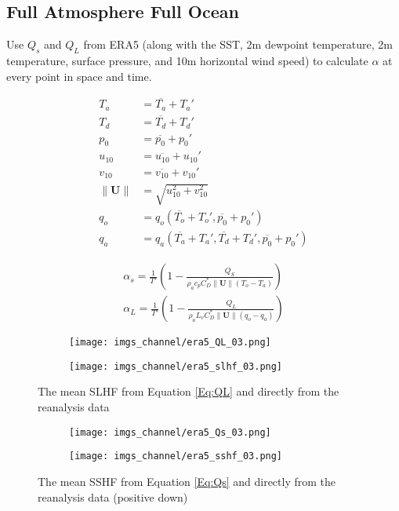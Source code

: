 \documentclass[12pt,a4paper]{article}
\newcommand{\Vmag}[1]{\| \mathbf{#1}\|}
\begin{document}
\subsection{Full Atmosphere Full Ocean}\label{sec:full}
Use $Q_s$ and $Q_L$ from ERA5 (along with the SST, 2m dewpoint temperature, 2m temperature, surface pressure, and 10m horizontal wind speed) to calculate $\alpha$ at every point in space and time. 

\begin{align}
T_a &=\overline{T_a} + T_a' \\
T_d &=\overline{T_d} + T_d' \\
p_0 &=\overline{p_0} + p_0' \\
u_{10} &= \overline{u_{10}} + u_{10}' \\
v_{10} &= \overline{v_{10}} + v_{10}'\\
\Vmag{U} &= \sqrt{u_{10}^2 + v_{10}^2}\\
q_o &= q_o(\overline{T_o}+T_o',\overline{p_0}+p_0')\\
q_a &= q_a(\overline{T_a}+T_a',\overline{T_d}+T_d',\overline{p_0}+p_0')
\end{align}

\begin{align}
\alpha_s = \frac{1}{T'}\left( 1-\frac{Q_S}{\rho_a c_p C_D^* \Vmag{U} (T_o-T_a)} \right)\\
\alpha_L = \frac{1}{T'}\left( 1-\frac{Q_L}{\rho_a L_v C_D^* \Vmag{U} (q_o-q_a)} \right)
\end{align}

\begin{figure}[h!]
\centering
\begin{subfigure}[t]{0.49\textwidth}
\texttt{[image: imgs\_channel/era5\_QL\_03.png]}
\end{subfigure}
\begin{subfigure}[t]{0.49\textwidth}
\texttt{[image: imgs\_channel/era5\_slhf\_03.png]}
\end{subfigure}
\caption{The mean SLHF from Equation \ref{Eq:QL} and directly from the reanalysis data}
\end{figure}

\begin{figure}[h!]
\centering
\begin{subfigure}[t]{0.49\textwidth}
\texttt{[image: imgs\_channel/era5\_Qs\_03.png]}
\end{subfigure}
\begin{subfigure}[t]{0.49\textwidth}
\texttt{[image: imgs\_channel/era5\_sshf\_03.png]}
\end{subfigure}
\caption{The mean SSHF from Equation \ref{Eq:Qs} and directly from the reanalysis data (positive down)}
\end{figure}
\end{document}
